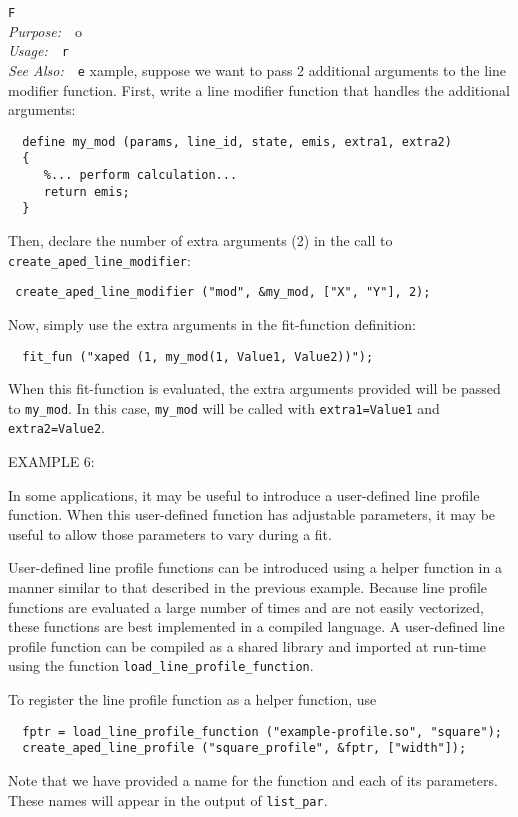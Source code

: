 \documentclass{book}
\makeatletter
\newif\ifpdf
\newenvironment{isisfunction}[4]%
{\index{{#1}@{\tt #1}}%
  \ifpdf
  \else
     \addcontentsline{toc}{subsection}{{#1} -- {#2}}
  \fi
  \vbox{
          \vspace*{\baselineskip}
          {\LARGE\tt #1}\vspace*{\baselineskip}\\
          {{\it Purpose:}~~{#2}}\\
          {{\it Usage:}~~{\tt #3}}\\
          {{\it See Also:}~~{\tt #4}}
       }
}%
{ }
\makeatother
\begin{document}
\begin{isisfunction}
For example, suppose we want to pass 2 additional arguments to the line
modifier function.  First, write a line modifier function that handles the
additional arguments:
\begin{verbatim}
  define my_mod (params, line_id, state, emis, extra1, extra2)
  {
     %... perform calculation...
     return emis;
  }
\end{verbatim}
Then, declare the number of extra arguments (2) in the call to
\verb|create_aped_line_modifier|:
\begin{verbatim}
 create_aped_line_modifier ("mod", &my_mod, ["X", "Y"], 2);
\end{verbatim}
Now, simply use the extra arguments in the fit-function
definition:
\begin{verbatim}
  fit_fun ("xaped (1, my_mod(1, Value1, Value2))");
\end{verbatim}
When this fit-function is evaluated, the extra arguments provided will be
passed to \verb|my_mod|.  In this case, \verb|my_mod| will be called with
\verb|extra1=Value1| and \verb|extra2=Value2|.

EXAMPLE 6:

In some applications, it may be useful to introduce a user-defined line
profile function. When this user-defined function has adjustable parameters,
it may be useful to allow those parameters to vary during a fit.

User-defined line profile functions can be introduced using a helper function
in a manner similar to that described in the previous example. Because line
profile functions are evaluated a large number of times and are not easily
vectorized, these functions are best implemented in a compiled language. A
user-defined line profile function can be compiled as a shared library and
imported at run-time using the function \verb|load_line_profile_function|.

To register the line profile function as a helper function, use
\begin{verbatim}
  fptr = load_line_profile_function ("example-profile.so", "square");
  create_aped_line_profile ("square_profile", &fptr, ["width"]);
\end{verbatim}
Note that we have provided a name for the function and each of its parameters.
These names will appear in the output of \verb|list_par|.


\end{isisfunction}
\end{document}
